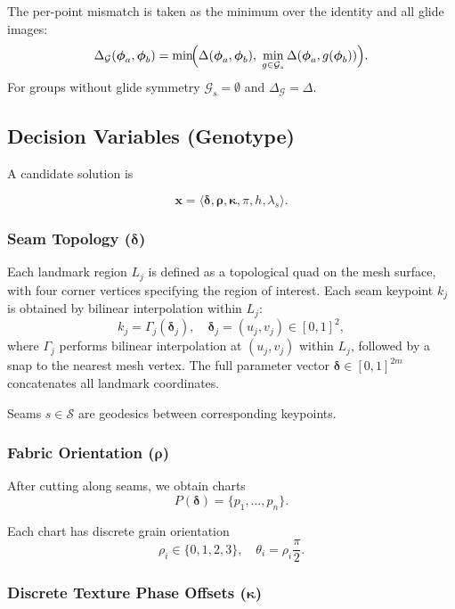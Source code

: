 \documentclass[runningheads]{llncs}
\begin{document}
The per-point mismatch is taken as the minimum over the identity and all glide images:
\[
\Delta_{\mathcal{G}}(\boldsymbol{\phi}_a, \boldsymbol{\phi}_b)
= \min\!\Bigl(
    \Delta(\boldsymbol{\phi}_a, \boldsymbol{\phi}_b),\;
    \min_{g \in \mathcal{G}_s} \Delta(\boldsymbol{\phi}_a, g(\boldsymbol{\phi}_b))
  \Bigr).
\]
For groups without glide symmetry $\mathcal{G}_s = \emptyset$ and
$\Delta_{\mathcal{G}} = \Delta$.

\subsection{Decision Variables (Genotype)}

A candidate solution is

\[
\mathbf{x} =
\langle
\boldsymbol{\delta},
\boldsymbol{\rho},
\boldsymbol{\kappa},
\pi,
h,
\lambda_s
\rangle.
\]

\subsubsection{Seam Topology ($\boldsymbol{\delta}$)}

Each landmark region $L_j$ is defined as a topological quad on the mesh surface,
with four corner vertices specifying the region of interest.
Each seam keypoint $k_j$ is obtained by bilinear interpolation within $L_j$:
\[
k_j = \Gamma_j(\boldsymbol{\delta}_j), \quad \boldsymbol{\delta}_j = (u_j, v_j) \in [0,1]^2,
\]
where $\Gamma_j$ performs bilinear interpolation at $(u_j, v_j)$ within $L_j$,
followed by a snap to the nearest mesh vertex.
The full parameter vector $\boldsymbol{\delta} \in [0,1]^{2m}$ concatenates all landmark coordinates.

Seams $s \in \mathcal{S}$ are geodesics between corresponding keypoints.

\subsubsection{Fabric Orientation ($\boldsymbol{\rho}$)}

After cutting along seams, we obtain charts
\[
P(\boldsymbol{\delta}) = \{p_1, \dots, p_n\}.
\]

Each chart has discrete grain orientation
\[
\rho_i \in \{0,1,2,3\}, \quad \theta_i = \rho_i \frac{\pi}{2}.
\]

\subsubsection{Discrete Texture Phase Offsets ($\boldsymbol{\kappa}$)}
\end{document}
